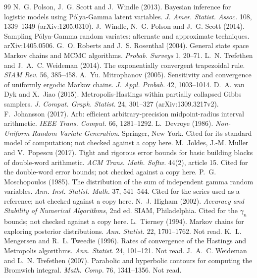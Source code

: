 \begin{thebibliography}{99}
 N.~G. Polson, J.~G. Scott and J.~Windle (2013). Bayesian inference for logistic models using
P\'olya-Gamma latent variables. \emph{J. Amer. Statist. Assoc.} 108, 1339--1349 (arXiv:1205.0310).
 J.~Windle, N.~G. Polson and J.~G. Scott (2014). Sampling P\'olya-Gamma random variates: alternate and
approximate techniques. arXiv:1405.0506.
 G.~O. Roberts and J.~S. Rosenthal (2004). General state space Markov chains and MCMC algorithms.
\emph{Probab. Surveys} 1, 20--71.
 L.~N. Trefethen and J.~A.~C. Weideman (2014). The exponentially convergent trapezoidal rule.
\emph{SIAM Rev.} 56, 385--458.
 A.~Yu. Mitrophanov (2005). Sensitivity and convergence of uniformly ergodic Markov chains.
\emph{J. Appl. Probab.} 42, 1003--1014.
 D.~A. van Dyk and X.~Jiao (2015). Metropolis-Hastings within partially collapsed Gibbs samplers.
\emph{J. Comput. Graph. Statist.} 24, 301--327 (arXiv:1309.3217v2).
 F.~Johansson (2017). Arb: efficient arbitrary-precision midpoint-radius interval arithmetic.
\emph{IEEE Trans. Comput.} 66, 1281--1292.
 L.~Devroye (1986). \emph{Non-Uniform Random Variate Generation}. Springer, New York. Cited for its standard model of computation; not checked against a copy here.
 M.~Joldes, J.-M. Muller and V.~Popescu (2017). Tight and rigorous error bounds for basic building
blocks of double-word arithmetic. \emph{ACM Trans. Math. Softw.} 44(2), article 15. Cited for the double-word error
bounds; not checked against a copy here.
 P.~G. Moschopoulos (1985). The distribution of the sum of independent gamma random variables.
\emph{Ann. Inst. Statist. Math.} 37, 541--544. Cited for the series used as a reference; not checked against a
copy here.
 N.~J. Higham (2002). \emph{Accuracy and Stability of Numerical Algorithms}, 2nd ed. SIAM,
Philadelphia. Cited for the $\gamma_n$ bounds; not checked against a copy here.
 L.~Tierney (1994). Markov chains for exploring posterior distributions. \emph{Ann. Statist.} 22,
1701--1762. Not read.
 K.~L. Mengersen and R.~L. Tweedie (1996). Rates of convergence of the Hastings and Metropolis
algorithms. \emph{Ann. Statist.} 24, 101--121. Not read.
 J.~A.~C. Weideman and L.~N. Trefethen (2007). Parabolic and hyperbolic contours for computing the
Bromwich integral. \emph{Math. Comp.} 76, 1341--1356. Not read.
\end{thebibliography}

